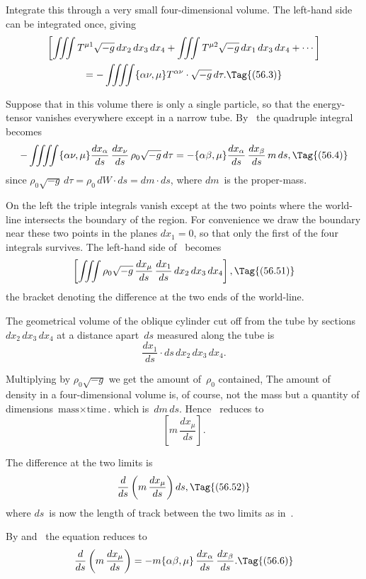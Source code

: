 \documentclass[12pt]{book}
\begin{document}
Integrate this through a very small four-dimensional volume. The left-hand
side can be integrated once, giving
\begin{multline*}
  \left[\iiint T^{\mu1} \sqrt{-g}\, dx_{2}\, dx_{3}\, dx_{4}
    + \iiint T^{\mu2} \sqrt{-g}\, dx_{1}\, dx_{3}\, dx_{4} + \cdots\right] \\
  = -\iiiint \{\alpha\nu, \mu\} T^{\alpha\nu} \cdot \sqrt{-g}\, d\tau.
  \Tag{(56.3)}
\end{multline*}

Suppose that in this volume there is only a single particle, so that the
energy-tensor vanishes everywhere except in a narrow tube. By~ the
quadruple integral becomes
\[
-\iiiint \{\alpha\nu, \mu\} \frac{dx_{\alpha}}{ds}\, \frac{dx_{\nu}}{ds}\, \rho_{0} \sqrt{-g}\, d\tau
= -\{\alpha\beta, \mu\} \frac{dx_{\alpha}}{ds}\, \frac{dx_{\beta}}{ds}\, m\, ds,
\Tag{(56.4)}
\]
since $\rho_{0} \sqrt{-g}\, d\tau = \rho_{0}\, dW \cdot ds = dm \cdot ds$, where $dm$~is the proper-mass.

On the left the triple integrals vanish except at the two points where the
world-line intersects the boundary of the region. For convenience we draw
the boundary near these two points in the planes $dx_{1} = 0$, so that only the first
of the four integrals survives. The left-hand side of~ becomes
\[
\left[\iiint \rho_{0} \sqrt{-g}\, \frac{dx_{\mu}}{ds}\, \frac{dx_{1}}{ds}\, dx_{2}\, dx_{3}\, dx_{4}\right],
\Tag{(56.51)}
\]
the bracket denoting the difference at the two ends of the world-line.

The geometrical volume of the oblique cylinder cut off from the tube by
sections $dx_{2}\, dx_{3}\, dx_{4}$ at a distance apart~$ds$ measured along the tube is
\[
\frac{dx_{1}}{ds} \cdot ds\, dx_{2}\, dx_{3}\, dx_{4}.
\]

Multiplying by $\rho_{0} \sqrt{-g}$ we get the amount of~$\rho_{0}$ contained\footnotemark,\footnotetext
  {The amount of density in a four-dimensional volume is, of course, not the mass but a
  quantity of dimensions $\text{mass} \times \text{time}$.}
which is~$dm\, ds$.
Hence ~reduces to
\[
\left[m\, \frac{dx_{\mu}}{ds}\right].
\]

The difference at the two limits is
\[
\frac{d}{ds} \left(m\, \frac{dx_{\mu}}{ds}\right) ds,
\Tag{(56.52)}
\]
where $ds$~is now the length of track between the two limits as in~.

By  and~ the equation reduces to
\[
\frac{d}{ds} \left(m\, \frac{dx_{\mu}}{ds}\right)
= -m \{\alpha\beta, \mu\}\, \frac{dx_{\alpha}}{ds}\, \frac{dx_{\beta}}{ds}.
\Tag{(56.6)}
\]
\end{document}
